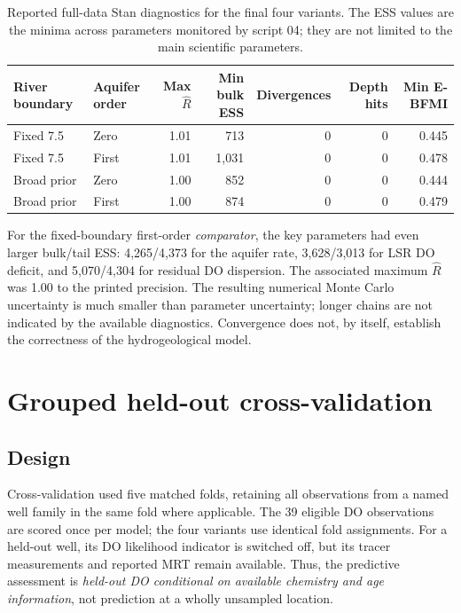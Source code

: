 \documentclass[11pt,a4paper]{article}
\begin{document}
\begin{table}[htbp]
\centering\small
\caption{Reported full-data Stan diagnostics for the final four variants. The ESS values are the minima across parameters monitored by script 04; they are not limited to the main scientific parameters.}
\label{tab:diagnostics}
\begin{tabular}{llrrrrr}
\toprule
River boundary & Aquifer order & Max \(\widehat R\) & Min bulk ESS & Divergences & Depth hits & Min E-BFMI\\
\midrule
Fixed 7.5 & Zero & 1.01 & 713 & 0 & 0 & 0.445\\
Fixed 7.5 & First & 1.01 & 1,031 & 0 & 0 & 0.478\\
Broad prior & Zero & 1.00 & 852 & 0 & 0 & 0.444\\
Broad prior & First & 1.00 & 874 & 0 & 0 & 0.479\\
\bottomrule
\end{tabular}
\end{table}

For the fixed-boundary first-order \emph{comparator}, the key parameters had even larger bulk/tail ESS: 4,265/4,373 for the aquifer rate, 3,628/3,013 for LSR DO deficit, and 5,070/4,304 for residual DO dispersion. The associated maximum \(\widehat R\) was 1.00 to the printed precision. The resulting numerical Monte Carlo uncertainty is much smaller than parameter uncertainty; longer chains are not indicated by the available diagnostics. Convergence does not, by itself, establish the correctness of the hydrogeological model.

\section{Grouped held-out cross-validation}
\label{sec:crossvalidation}
\subsection{Design}
Cross-validation used five matched folds, retaining all observations from a named well family in the same fold where applicable. The 39 eligible DO observations are scored once per model; the four variants use identical fold assignments. For a held-out well, its DO likelihood indicator is switched off, but its tracer measurements and reported MRT remain available. Thus, the predictive assessment is \emph{held-out DO conditional on available chemistry and age information}, not prediction at a wholly unsampled location.
\end{document}
